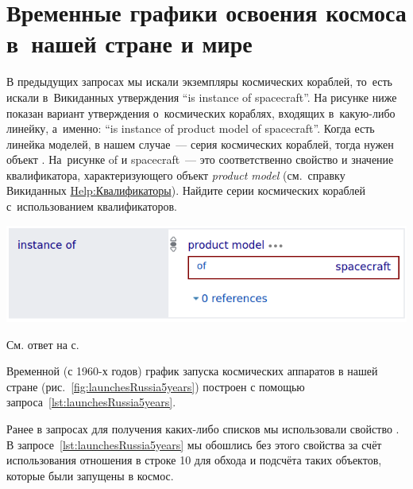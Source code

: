 \section{Временные графики освоения космоса в~нашей стране и мире}


\begin{marginfigure}[0\baselineskip]
    \MarginQuestion 
    В предыдущих запросах мы искали экземпляры космических кораблей, 
    то~есть искали в~Викиданных утверждения ``is instance of spacecraft''. 
    На рисунке ниже показан вариант утверждения 
    о~космических кораблях, входящих в~какую-либо линейку, а~именно: 
    ``is instance of product model of spacecraft''. 
    Когда есть линейка моделей, в нашем случае~--- серия космических кораблей, 
    тогда нужен объект . 
    На~рисунке of и spacecraft~--- 
    это соответственно свойство и значение квалификатора, характеризующего объект \emph{product model} 
    (см.~справку Викиданных \href{https://www.wikidata.org/?curid=16567549}{Help:Квалификаторы}). 
    Найдите серии космических кораблей с~использованием квалификаторов. 

    \vspace{3pt}
	\includegraphics[width=0.8\linewidth]{graphics/chapter/spacecraft_space_station/is_product_model_red.png}

    См. ответ на с.~\pageref{answer:product_model}\\
    \label{question:product_model}
\end{marginfigure}


Временной (с 1960-х годов) 
график запуска космических аппаратов в нашей стране (рис.~\ref{fig:launchesRussia5years}) 
построен с помощью запроса~\ref{lst:launchesRussia5years}.%

Ранее в запросах для получения каких-либо списков мы использовали свойство . 
В запросе~\ref{lst:launchesRussia5years} мы обошлись без этого свойства за счёт использования отношения 
 в строке 10 
для обхода и подсчёта таких объектов, которые были запущены в космос.  

